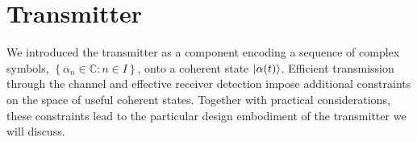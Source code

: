 \section{Transmitter}                                                                                                                                                                                                                                                                                                                                                                                                                                                                                                                                                                                                                                                                                                                     

We introduced the transmitter as a component encoding a sequence of complex symbols, $\left\{\alpha_n\in\mathbb{C}\colon n\in I\right\}$, onto a coherent state $\lvert\alpha(t)\rangle$.
Efficient transmission through the channel and effective receiver detection impose additional constraints on the space of useful coherent states.
Together with practical considerations, these constraints lead to the particular design embodiment of the transmitter we will discuss.

